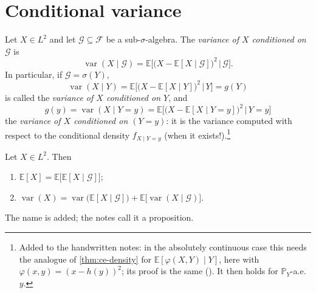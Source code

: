 
\section{Conditional variance}\label{sec:cp-variance}

\begin{definition}\label{def:cp-conditional-variance}
Let $X\in L^2$ and let $\mathcal G\subseteq\mathcal F$ be a sub-$\sigma$-algebra. The
\emph{variance of $X$ conditioned on $\mathcal G$} is
\[
  \operatorname{var}(X\mid\mathcal G)=\mathbb E\Big[\big(X-\mathbb E[X\mid\mathcal G]\big)^2\,\Big|\,\mathcal G\Big].
\]
In particular, if $\mathcal G=\sigma(Y)$,
\[
  \operatorname{var}(X\mid Y)=\mathbb E\Big[\big(X-\mathbb E[X\mid Y]\big)^2\,\Big|\,Y\Big]=g(Y)
\]
is called the \emph{variance of $X$ conditioned on $Y$}, and
\[
  g(y)=\operatorname{var}(X\mid Y=y)=\mathbb E\Big[\big(X-\mathbb E[X\mid Y=y]\big)^2\,\Big|\,Y=y\Big]
\]
the \emph{variance of $X$ conditioned on $(Y=y)$}: it is the variance computed with respect to the
conditional density $f_{X\mid Y=y}$ (when it exists!).\footnote{Added to the handwritten notes:
in the absolutely continuous case this needs the analogue of \cref{thm:ce-density} for
$\mathbb E[\varphi(X,Y)\mid Y]$, here with $\varphi(x,y)=(x-h(y))^2$; its proof is the same
(). It then holds for $\mathbb P_Y$-a.e.\ $y$.}
\end{definition}

\begin{proposition}\label{thm:cp-total-variance}
Let $X\in L^2$. Then
\begin{enumerate}[label=\arabic*)]
  \item $\mathbb E[X]=\mathbb E\big[\mathbb E[X\mid\mathcal G]\big]$;
  \item $\operatorname{var}(X)=\operatorname{var}\big(\mathbb E[X\mid\mathcal G]\big)+\mathbb E\big[\operatorname{var}(X\mid\mathcal G)\big]$.
\end{enumerate}
\end{proposition}

The name is added; the notes call it a proposition.

